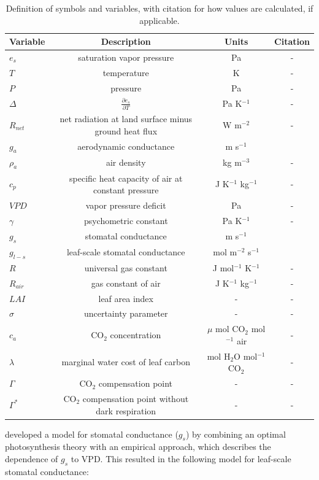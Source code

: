 \documentclass[draft,linenumbers]{agujournal}
\begin{document}
\begin{table}
  \caption{Definition of symbols and variables, with citation for how
values are calculated, if applicable.}
  \label{definitions} \centering \small
\begin{tabular}{l c c c} \hline Variable & Description & Units &
Citation \\ \hline $e_s$ & saturation vapor pressure & Pa & - \\ $T$ &
temperature & K & - \\ $P$ & pressure & Pa & - \\ $\Delta$ &
$\frac{\partial e_s}{\partial T}$ & Pa K$^{-1}$ & - \\ $R_{net}$ & net
radiation at land surface minus ground heat flux & W m$^{-2}$ & - \\
$g_a$ & aerodynamic conductance & m s$^{-1}$ &
\citet{Shuttleworth_2012} \\ $\rho_a$ & air density & kg m$^{-3}$ & -
\\ $c_p$ & specific heat capacity of air at constant pressure & J
K$^{-1}$ kg$^{-1}$ & - \\ $VPD$ & vapor pressure deficit & Pa & - \\
$\gamma$ & psychometric constant & Pa K$^{-1}$ & - \\ $g_s$ & stomatal
conductance & m s$^{-1}$ & \citet{MEDLYN_2011} \\ $g_{l-s}$ &
leaf-scale stomatal conductance & mol m$^{-2}$ s$^{-1}$ &
\citet{MEDLYN_2011} \\ $R$ & universal gas constant & J mol$^{-1}$
K$^{-1}$ & - \\ $R_{air}$ & gas constant of air & J K$^{-1}$ kg$^{-1}$
& - \\ $LAI$ & leaf area index & -& - \\ $\sigma$ & uncertainty
parameter & -& - \\ $c_a$ & CO$_2$ concentration & $\mu$ mol CO$_2$
mol$^{-1}$ air& - \\ $\lambda$ & marginal water cost of leaf carbon &
mol H$_2$O mol$^{-1}$ CO$_2$ & - \\ $\Gamma$ & CO$_2$ compensation
point & - & - \\ $\Gamma^*$ & CO$_2$ compensation point without dark
respiration & - & - \\ \hline
\end{tabular}
\end{table}


\citet{MEDLYN_2011} developed a model for stomatal conductance ($g_s$)
by combining an optimal photosynthesis theory \citep{Farquhar_1980,
Katul_2010} with an empirical approach, which describes the dependence
of $g_s$ to VPD. This resulted in the following model for leaf-scale
stomatal conductance:
\end{document}
